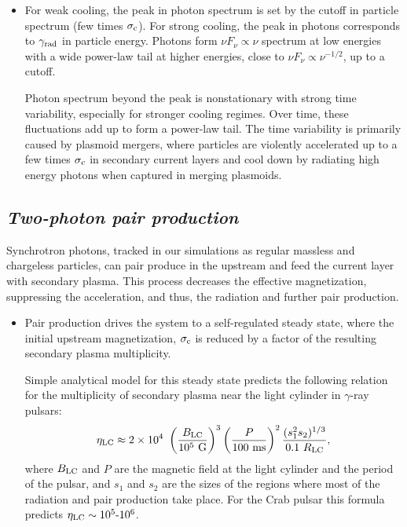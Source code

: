 \begin{itemize}[leftmargin=*,wide = 0pt]
    \item For weak cooling, the peak in photon spectrum is set by the cutoff in particle spectrum (few times $\sigma_{\rm c}$). For strong cooling, the peak in photons corresponds to $\gamma_{\rm rad}$ in particle energy. Photons form $\nu F_{\nu}\propto \nu$ spectrum at low energies with a wide power-law tail at higher energies, close to $\nu F_{\nu}\propto \nu^{-1/2}$, up to a cutoff.

    Photon spectrum beyond the peak is nonstationary with strong time variability, especially for stronger cooling regimes. Over time, these fluctuations add up to form a power-law tail. The time variability is primarily caused by plasmoid mergers, where particles are violently accelerated up to a few times $\sigma_{\rm c}$ in secondary current layers and cool down by radiating high energy photons when captured in merging plasmoids.

\end{itemize}

\subsection*{\small \it Two-photon pair production}

Synchrotron photons, tracked in our simulations as regular massless and chargeless particles, can pair produce in the upstream and feed the current layer with secondary plasma. This process decreases the effective magnetization, suppressing the acceleration, and thus, the radiation and further pair production.

\begin{itemize}[leftmargin=*,wide = 0pt]
    \item Pair production drives the system to a self-regulated steady state, where the initial upstream magnetization, $\sigma_{\rm c}$ is reduced by a factor of the resulting secondary plasma multiplicity.

    Simple analytical model for this steady state predicts the following relation for the multiplicity of secondary plasma near the light cylinder in $\gamma$-ray pulsars:
    \begin{equation}
        \label{eq:pairprod-eta_th}
        \eta_{\rm LC} \approx 2\times 10^4~
        \left(\frac{B_{\rm LC}}{10^5~\text{G}}\right)^{3}
        \left(\frac{P}{100~\text{ms}}\right)^{2}
        \frac{(s_1^2 s_2)^{1/3}}{0.1~R_{\rm LC}},
    \end{equation}
    where $B_{\rm LC}$ and $P$ are the magnetic field at the light cylinder and the period of the pulsar, and $s_1$ and $s_2$ are the sizes of the regions where most of the radiation and pair production take place. For the Crab pulsar this formula predicts $\eta_{\rm LC} \sim 10^5\text{-}10^6$.
\end{itemize}

